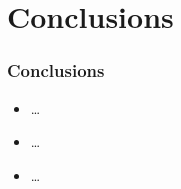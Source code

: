 \documentclass[10pt,aspectratio=169]{beamer}
\begin{document}
\section{Conclusions}

\begin{frame}
\frametitle{Conclusions}

\begin{itemize}[<+->]
        \item \dots
        \item \dots
        \item \dots
\end{itemize}

\end{frame}
\end{document}

